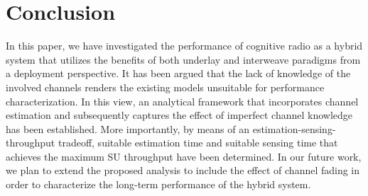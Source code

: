 \section{Conclusion} \label{sec:conc}
In this paper, we have investigated the performance of cognitive radio as a hybrid system that utilizes the benefits of both underlay and interweave paradigms from a deployment perspective. It has been argued that the lack of knowledge of the involved channels renders the existing models unsuitable for performance characterization. In this view, an analytical framework that incorporates channel estimation and subsequently captures the effect of imperfect channel knowledge has been established. More importantly, by means of an estimation-sensing-throughput tradeoff, suitable estimation time and suitable sensing time that achieves the maximum SU throughput have been determined. In our future work, we plan to extend the proposed analysis to include the effect of channel fading in order to characterize the long-term performance of the hybrid system. 

